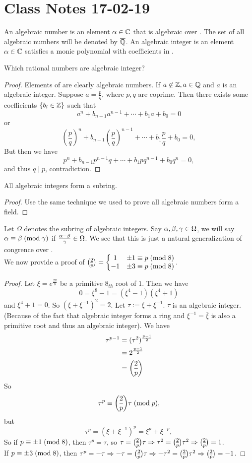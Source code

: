 \section{Class Notes 17-02-19}
\begin{definition}
An algebraic number is an element $\alpha\in\mathbb{C}$ that is algebraic over \Q. The set of all algebraic numbers will be denoted by $\overline{\mathbb{Q}}$. An algebraic integer is an element $\alpha\in\mathbb{C}$ satisfies a monic polynomial with coefficients in \Z.
\end{definition}
\begin{exercise}
Which rational numbers are algebraic integer?
\end{exercise}
\begin{proof}
Elements of \Z are clearly algebraic numbers. If $a\not\in\mathbb{Z},a\in\mathbb{Q}$ and $a$ is an algebraic integer. Suppose $a=\frac{p}{q}$, where $p,q$ are coprime. Then there exists some coefficients $\{b_i\in\mathbb{Z}\}$ such that
$$
a^n + b_{n-1}a^{n-1} + \cdots + b_1 a+ b_0 =0
$$
or
$$
\left(\frac{p}{q}\right)^n + b_{n-1}\left(\frac{p}{q}\right)^{n-1} + \cdots + b_1 \frac{p}{q}+ b_0 =0,
$$But then we have 
$$
p^n + b_{n-1}p^{n-1}q + \cdots + b_1 p q^{n-1}+ b_0 q^{n}=0,
$$
and thus $q\mid p$, contradiction.
\end{proof}
\begin{theorem}
All algebraic integers form a subring.
\end{theorem}
\begin{proof}
Use the same technique we used to prove all algebraic numbers form a field.
\end{proof}
Let $\Omega$ denotes the subring of algebraic integers. Say $\alpha, \beta, \gamma\in \Omega$, we will say $\alpha\equiv \beta\;(\mbox{mod}{\;\gamma})$ if $\frac{\alpha-\beta}{\gamma}\in\Omega$. We see that this is just a natural generalization of congrence over \Z.\\
We now provide a proof of $\leg{2}{p}=\left\{
\begin{matrix}
1 & \pm1\con{p}{8} \\ -1 & \pm3\con{p}{8}\end{matrix}\right.$.
\begin{proof}
Let $\xi = e^{\frac{2\pi}{8}}$ be a primitive $8_{th}$ root of $1$. Then we have
$$
0 = \xi^8-1  = (\xi^4-1)(\xi^4+1)
$$
and $\xi^4+1=0$. So $(\xi+\xi^{-1})^2=2$. Let $\tau:=\xi+\xi^{-1}$. $\tau$ is an algebraic integer. (Because of the fact that algebraic integer forms a ring and $\xi^{-1} = \overline{\xi}$ is also a primitive root and thus an algebraic integer). We have
\begin{align*}
\tau^{p-1} &=(\tau^2)^{\frac{p-1}{2}}\\&=2^{\frac{p-1}{2}}\\&=\leg{2}{p}
\end{align*}
So $$\tau^p\con{\leg{2}{p}\tau}{p},$$but $$\tau^{p} = (\xi+\xi^{-1})^{p}= \xi^p+\xi^{-p},$$ 
So if $p\equiv \pm1\;(\mbox{mod}{\;8})$, then $\tau^p={\tau}$, so $\tau =\leg{2}{p}\tau\Rightarrow \tau^2 = \leg{2}{p}\tau^2\Rightarrow \leg{2}{p}=1$.\\If $p\equiv \pm3\;(\mbox{mod}{\;8})$, then $\tau^p=-\tau\Rightarrow -\tau =\leg{2}{p}\tau\Rightarrow -\tau^2 = \leg{2}{p}\tau^2\Rightarrow \leg{2}{p}=-1$.
\end{proof}
